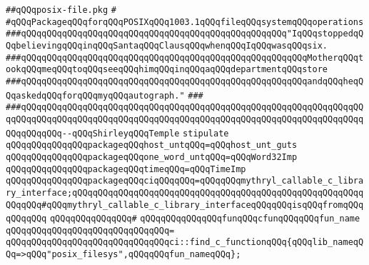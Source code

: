 \label{src/lib/std/src/psx/posix-file-system-64.pkg}
\verb|##qQQqposix-file.pkg|\newline
\verb|#|\newline
\verb|#qQQqPackageqQQqforqQQqPOSIXqQQq1003.1qQQqfileqQQqsystemqQQqoperations|\newline
\newline
\newline
\newline
\verb|###qQQqqQQqqQQqqQQqqQQqqQQqqQQqqQQqqQQqqQQqqQQqqQQqqQQq"IqQQqstoppedqQQqbelievingqQQqinqQQqSantaqQQqClausqQQqwhenqQQqIqQQqwasqQQqsix.|\newline
\verb|###qQQqqQQqqQQqqQQqqQQqqQQqqQQqqQQqqQQqqQQqqQQqqQQqqQQqqQQqMotherqQQqtookqQQqmeqQQqtoqQQqseeqQQqhimqQQqinqQQqaqQQqdepartmentqQQqstore|\newline
\verb|###qQQqqQQqqQQqqQQqqQQqqQQqqQQqqQQqqQQqqQQqqQQqqQQqqQQqqQQqandqQQqheqQQqaskedqQQqforqQQqmyqQQqautograph."|\newline
\verb|###|\newline
\verb|###qQQqqQQqqQQqqQQqqQQqqQQqqQQqqQQqqQQqqQQqqQQqqQQqqQQqqQQqqQQqqQQqqQQqqQQqqQQqqQQqqQQqqQQqqQQqqQQqqQQqqQQqqQQqqQQqqQQqqQQqqQQqqQQqqQQqqQQqqQQqqQQqqQQq--qQQqShirleyqQQqTemple|\newline
\newline
\newline
\newline
\verb|stipulate|\newline
\verb|qQQqqQQqqQQqqQQqpackageqQQqhost_untqQQq=qQQqhost_unt_guts|\newline
\verb|qQQqqQQqqQQqqQQqpackageqQQqone_word_untqQQq=qQQqWord32Imp|\newline
\verb|qQQqqQQqqQQqqQQqpackageqQQqtimeqQQq=qQQqTimeImp|\newline
\verb|qQQqqQQqqQQqqQQqpackageqQQqciqQQqqQQq=qQQqqQQqmythryl_callable_c_library_interface;qQQqqQQqqQQqqQQqqQQqqQQqqQQqqQQqqQQqqQQqqQQqqQQqqQQqqQQqqQQqqQQq#qQQqmythryl_callable_c_library_interfaceqQQqqQQqisqQQqfromqQQqqQQqqQQq|\newline
\verb|qQQqqQQqqQQqqQQq#|\newline
\verb|qQQqqQQqqQQqqQQqfunqQQqcfunqQQqqQQqfun_name|\newline
\verb|qQQqqQQqqQQqqQQqqQQqqQQqqQQqqQQq=|\newline
\verb|qQQqqQQqqQQqqQQqqQQqqQQqqQQqqQQqci::find_c_functionqQQq{qQQqlib_nameqQQq=>qQQq"posix_filesys",qQQqqQQqfun_nameqQQq};|\newline

